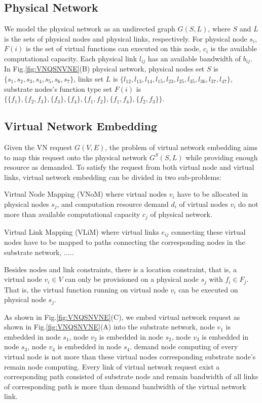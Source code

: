 \subsection{Physical Network}
We model the physical network as an undirected graph $G (S,L)$, where $S$ and $L$ is the sets of physical nodes and physical links, respectively. For physical node $s_i$, $F(i)$ is the set of virtual functions can executed on this  node, $c_i$ is the available computational capacity. Each physical link $l_{ij}$ has an available bandwidth of $b_{ij}$. In Fig.\ref{fig:VNQSNVNE}(B) physical network, physical nodes set $S$ is $\{s_1,s_2,s_3,s_4,s_5,s_6,s_7\}$,  links set $L$ is $\{l_{12},l_{13},l_{14},l_{15},l_{23},l_{25},l_{35},l_{36},l_{37},l_{47}\}$, substrate nodes's function type set $F(i)$ is $\{\{f_1\},\{f_2,f_3\},\{f_3\},\{f_4\},\{f_1,f_2\},\{f_1,f_4\},\{f_2,f_3\}\}$.



\subsection{Virtual Network Embedding}
Given the VN request $G (V,E)$, the problem of virtual network embedding aims to map this request onto the physical network $G^S (S,L)$ while providing enough resource as demanded.
To satisfy the request from both virtual node and virtual links, virtual network embedding  can be divided in two sub-problems:

Virtual Node Mapping (VNoM) where virtual nodes $v_i$ have to be allocated in physical nodes $s_j$, and computation resource demand $d_i$ of virtual nodes $v_i$ do not more than available computational capacity $c_j$ of physical network.

Virtual Link Mapping (VLiM) where virtual links $e_{ij}$ connecting these virtual nodes have to be mapped to paths connecting the corresponding nodes in the substrate network,  .....

Besides nodes and link constraints, there is a location constraint, that is, a virtual node ${v_i} \in V$ can only be provisioned on a physical node $s_j$ with ${f_i} \in {F_j}$. That is, the virtual function running on virtual node ${v_i}$ can be executed on physical node $s_j$.

As shown in Fig.\ref{fig:VNQSNVNE}(C), we embed virtual network request as shown in Fig.\ref{fig:VNQSNVNE}(A) into the substrate network, node $v_1$ is embedded in node $s_1$, node $v_2$ is embedded in node $s_2$, node $v_3$ is embedded in node $s_3$, node $v_4$ is embedded in node $s_4$. demand node computing of every virtual node is not more than these virtual nodes corresponding substrate node's remain node computing. Every link of virtual network request exist a corresponding path consisted of substrate node and remain bandwidth of all links of corresponding path is more than demand  bandwidth of the virtual network link.


